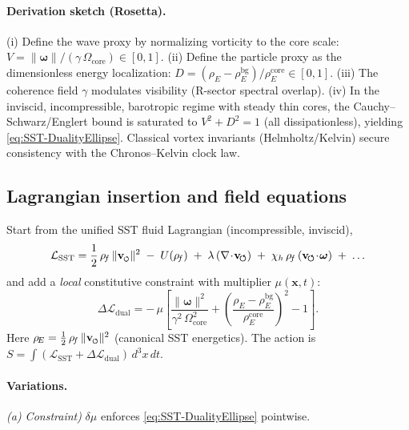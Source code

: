 \documentclass[10pt,reprint,aps,onecolumn,nofootinbib]{revtex4-2}
\newcommand{\vswirl}{\mathbf{v}_{\!\boldsymbol{\circlearrowleft}}}
\newcommand{\vnorm}{\lVert \mathbf{v}_{\mkern-2mu\scriptscriptstyle\boldsymbol{\circlearrowleft}} \rVert}               %
\newcommand{\rhoE}{\rho_{\!E}}                           %
\newcommand{\omegaVec}{\boldsymbol{\omega}}
\newcommand{\rhoF}{\rho_{\!f}}     %
\newcommand{\OmegaCore}{\Omega_{\mathrm{core}}}
\newcommand{\bg}{\mathrm{bg}}
\newcommand{\core}{\mathrm{core}}
\begin{document}
    \paragraph{Derivation sketch (Rosetta).}
    (i) Define the wave proxy by normalizing vorticity to the core scale:
        $V=\lVert\omegaVec\rVert/(\gamma\,\OmegaCore)\in[0,1]$.
        (ii) Define the particle proxy as the dimensionless energy localization:
        $D=(\rhoE-\rhoE^{\bg})/\rhoE^{\core}\in[0,1]$.
        (iii) The coherence field $\gamma$ modulates visibility (R-sector spectral overlap).
        (iv) In the inviscid, incompressible, barotropic regime with steady thin cores, the Cauchy–Schwarz/Englert
        bound is saturated to $V^2+D^2=1$ (all dissipationless), yielding \eqref{eq:SST-DualityEllipse}.
        Classical vortex invariants (Helmholtz/Kelvin) secure consistency with the Chronos–Kelvin clock law.

    \subsection{Lagrangian insertion and field equations}
    \label{subsec:Lag-DE}

    Start from the unified SST fluid Lagrangian (incompressible, inviscid),
    \begin{equation}
    \mathcal L_{\text{SST}} =
    \frac12\,\rhoF\,\vnorm^{2}
    \;-\; U(\rhoF)
    \;+\;\lambda\,(\nabla\!\cdot\!\vswirl)
    \;+\;\chi_h\,\rhoF\,(\vswirl\!\cdot\!\omegaVec)
    \;+\;\ldots
    \end{equation}
    and add a \emph{local} constitutive constraint with multiplier $\mu(\mathbf x,t)$:
    \begin{equation}
    \Delta\mathcal L_{\text{dual}}
    = -\,\mu\!\left[
                  \frac{\lVert\omegaVec\rVert^{2}}{\gamma^{2}\,\OmegaCore^{2}}
                  +
                  \left(\frac{\rhoE-\rhoE^{\bg}}{\rhoE^{\core}}\right)^{2}
                  -1
    \right].
    \label{eq:dual-constraint-term}
    \end{equation}
    Here $\rhoE=\tfrac12\,\rhoF\,\vnorm^{2}$ (canonical SST energetics).
    The action is $S=\int (\mathcal L_{\text{SST}}+\Delta\mathcal L_{\text{dual}})\,d^3x\,dt$.

    \paragraph{Variations.}
        \emph{(a) Constraint)} $\delta\mu$ enforces \eqref{eq:SST-DualityEllipse} pointwise.
\end{document}
